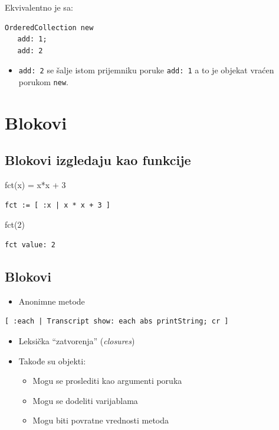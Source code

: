 \documentclass[presentation]{beamer}
\begin{document}
Ekvivalentno je sa:

\begin{verbatim}
OrderedCollection new
   add: 1;
   add: 2
\end{verbatim}

\begin{itemize}
\item \texttt{add: 2} se šalje istom prijemniku poruke \texttt{add: 1} a to je objekat vraćen
porukom \texttt{new}.
\end{itemize}

\section{Blokovi}
\label{sec:orgcbb58b0}
\subsection{Blokovi izgledaju kao funkcije}
\label{sec:orgeb3fabb}


fct(x) = x*x + 3

\begin{verbatim}
fct := [ :x | x * x + 3 ]
\end{verbatim}

fct(2)

\begin{verbatim}
fct value: 2
\end{verbatim}

\subsection{Blokovi}
\label{sec:org7cee539}

\begin{itemize}
\item Anonimne metode
\end{itemize}

\begin{verbatim}
[ :each | Transcript show: each abs printString; cr ]
\end{verbatim}

\begin{itemize}
\item Leksička ``zatvorenja'' (\emph{closures})
\item Takođe su objekti:
\begin{itemize}
\item Mogu se proslediti kao argumenti poruka
\item Mogu se dodeliti varijablama
\item Mogu biti povratne vrednosti metoda
\end{itemize}
\end{itemize}
\end{document}
